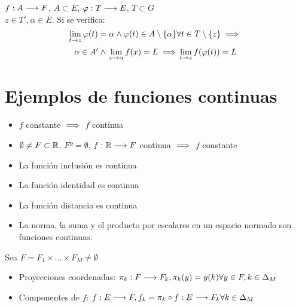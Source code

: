\begin{prop}
    $f:A\longrightarrow F$, $A\subset E$, $\varphi :T\longrightarrow E$, $T \subset G$\\
    $z \in T', \alpha\in E$. Si se verifica:
    $$\lim_{t\to z}\varphi(t) = \alpha \\ \land \\ \varphi(t) \in A\setminus \{\alpha\}\\ \forall t \in T\setminus \{z\} \implies$$ 
    $$\alpha\in A' \\ \land \\ \lim_{x\to \alpha}f(x) = L \\ \implies \\ \lim_{t\to z} f(\varphi(t)) = L$$
\end{prop}

\section{Ejemplos de funciones continuas}
\begin{itemize}
    \item $f$ constante $\implies$ $f$ continua
    \item $\emptyset \neq F \subset \mathbb R$, $Fº = \emptyset$, $f:\mathbb R \longrightarrow F$ continua $\implies$ $f$ constante
    \item La función inclusión es continua
    \item La función identidad es continua
    \item La función distancia es continua
    \item La norma, la suma y el producto por escalares en un espacio normado son funciones continuas.
\end{itemize}

\begin{definicion}
    Sea $F=F_1\times...\times F_M \neq \emptyset$ 
    \begin{itemize}
        \item Proyecciones coordenadas:
        $\pi_k:F\longrightarrow F_k, \\ \pi_k(y) = y(k) \\ \forall y \in F, \\ k \in \Delta_M$
        \item Componentes de $f$:
        $f:E \longrightarrow F, \\ f_k=\pi_k\circ f:E\longrightarrow F_k\\ \forall k \in \Delta_M$
    \end{itemize}
\end{definicion}

